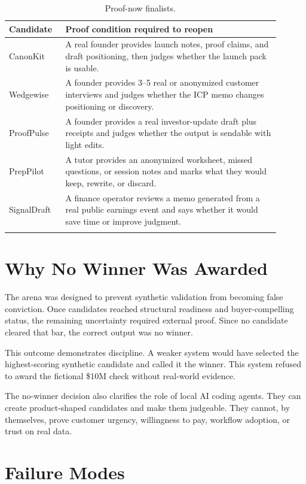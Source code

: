 \documentclass[11pt]{article}
\begin{document}
\begin{longtable}{L{0.18\linewidth} L{0.72\linewidth}}
\toprule
Candidate & Proof condition required to reopen \\
\midrule
\endhead
CanonKit & A real founder provides launch notes, proof claims, and draft positioning, then judges whether the launch pack is usable. \\
Wedgewise & A founder provides 3--5 real or anonymized customer interviews and judges whether the ICP memo changes positioning or discovery. \\
ProofPulse & A founder provides a real investor-update draft plus receipts and judges whether the output is sendable with light edits. \\
PrepPilot & A tutor provides an anonymized worksheet, missed questions, or session notes and marks what they would keep, rewrite, or discard. \\
SignalDraft & A finance operator reviews a memo generated from a real public earnings event and says whether it would save time or improve judgment. \\
\bottomrule
\caption{Proof-now finalists.}
\end{longtable}

\section{Why No Winner Was Awarded}

The arena was designed to prevent synthetic validation from becoming false conviction. Once candidates reached structural readiness and buyer-compelling status, the remaining uncertainty required external proof. Since no candidate cleared that bar, the correct output was no winner.

This outcome demonstrates discipline. A weaker system would have selected the highest-scoring synthetic candidate and called it the winner. This system refused to award the fictional \$10M check without real-world evidence.

The no-winner decision also clarifies the role of local AI coding agents. They can create product-shaped candidates and make them judgeable. They cannot, by themselves, prove customer urgency, willingness to pay, workflow adoption, or trust on real data.

\section{Failure Modes}
\end{document}
